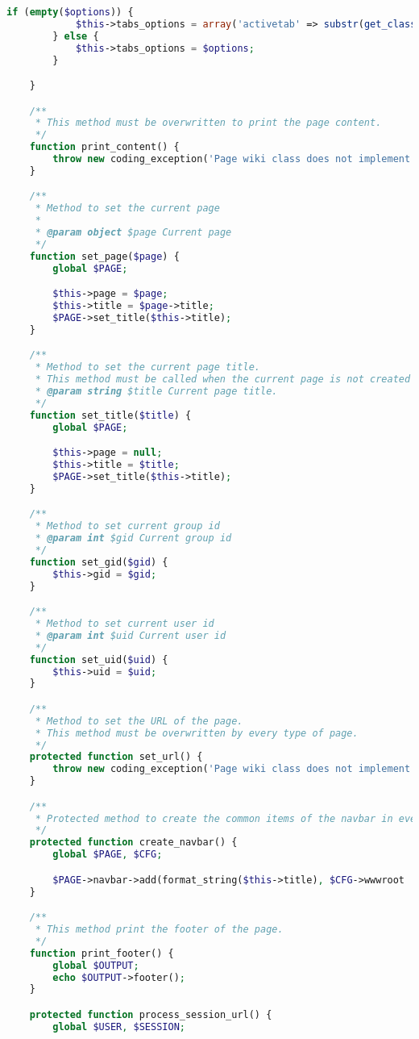 \begin{lstlisting}[language=PHP]
        if (empty($options)) {
            $this->tabs_options = array('activetab' => substr(get_class($this), 10));
        } else {
            $this->tabs_options = $options;
        }

    }

    /**
     * This method must be overwritten to print the page content.
     */
    function print_content() {
        throw new coding_exception('Page wiki class does not implement method print_content()');
    }

    /**
     * Method to set the current page
     *
     * @param object $page Current page
     */
    function set_page($page) {
        global $PAGE;

        $this->page = $page;
        $this->title = $page->title;
        $PAGE->set_title($this->title);
    }

    /**
     * Method to set the current page title.
     * This method must be called when the current page is not created yet.
     * @param string $title Current page title.
     */
    function set_title($title) {
        global $PAGE;

        $this->page = null;
        $this->title = $title;
        $PAGE->set_title($this->title);
    }

    /**
     * Method to set current group id
     * @param int $gid Current group id
     */
    function set_gid($gid) {
        $this->gid = $gid;
    }

    /**
     * Method to set current user id
     * @param int $uid Current user id
     */
    function set_uid($uid) {
        $this->uid = $uid;
    }

    /**
     * Method to set the URL of the page.
     * This method must be overwritten by every type of page.
     */
    protected function set_url() {
        throw new coding_exception('Page wiki class does not implement method set_url()');
    }

    /**
     * Protected method to create the common items of the navbar in every page type.
     */
    protected function create_navbar() {
        global $PAGE, $CFG;

        $PAGE->navbar->add(format_string($this->title), $CFG->wwwroot . '/mod/wikicode/view.php?pageid=' . $this->page->id);
    }

    /**
     * This method print the footer of the page.
     */
    function print_footer() {
        global $OUTPUT;
        echo $OUTPUT->footer();
    }

    protected function process_session_url() {
        global $USER, $SESSION;


\end{lstlisting}
